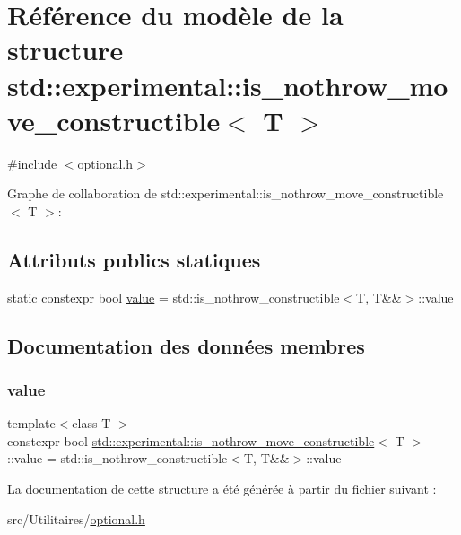 \hypertarget{structstd_1_1experimental_1_1is__nothrow__move__constructible}{}\section{Référence du modèle de la structure std\+:\+:experimental\+:\+:is\+\_\+nothrow\+\_\+move\+\_\+constructible$<$ T $>$}
\label{structstd_1_1experimental_1_1is__nothrow__move__constructible}


{\ttfamily \#include $<$optional.\+h$>$}



Graphe de collaboration de std\+:\+:experimental\+:\+:is\+\_\+nothrow\+\_\+move\+\_\+constructible$<$ T $>$\+:
\subsection*{Attributs publics statiques}
\begin{DoxyCompactItemize}
\item 
static constexpr bool \hyperlink{structstd_1_1experimental_1_1is__nothrow__move__constructible_a3dfc956c352cb27873ec02dbf4f0cb93}{value} = std\+::is\+\_\+nothrow\+\_\+constructible$<$T, T\&\&$>$\+::value
\end{DoxyCompactItemize}


\subsection{Documentation des données membres}
\mbox{\label{structstd_1_1experimental_1_1is__nothrow__move__constructible_a3dfc956c352cb27873ec02dbf4f0cb93}} 
\subsubsection{\texorpdfstring{value}{value}}
{\footnotesize\ttfamily template$<$class T $>$ \\
constexpr bool \hyperlink{structstd_1_1experimental_1_1is__nothrow__move__constructible}{std\+::experimental\+::is\+\_\+nothrow\+\_\+move\+\_\+constructible}$<$ T $>$\+::value = std\+::is\+\_\+nothrow\+\_\+constructible$<$T, T\&\&$>$\+::value\hspace{0.3cm}{\ttfamily [static]}}



La documentation de cette structure a été générée à partir du fichier suivant \+:\begin{DoxyCompactItemize}
\item 
src/\+Utilitaires/\hyperlink{optional_8h}{optional.\+h}\end{DoxyCompactItemize}
